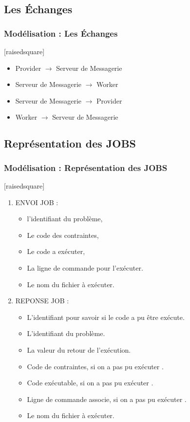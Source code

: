 \documentclass[slidetop,11pt]{beamer}
\begin{document}
\subsection[Les Échanges]{Les Échanges}
\begin{frame}[label=echanges]
\frametitle{Modélisation : Les Échanges}

[raisedsquare]
\begin{itemize}
      \item Provider $\rightarrow$ Serveur de Messagerie
      \item Serveur de Messagerie $\rightarrow$ Worker
      \item Serveur de Messagerie $\rightarrow$ Provider
      \item Worker $\rightarrow$ Serveur de Messagerie
\end{itemize}

\end{frame}
\subsection[Représentation des JOBS]{Représentation des JOBS}
\begin{frame}[label=rep_job,fragile]
\frametitle{Modélisation : Représentation des JOBS}
[raisedsquare]
 
\begin{enumerate} \item ENVOI JOB :
\begin{itemize}
\item l'identifiant du problème,
\item Le code des contraintes,
\item Le code a exécuter,
\item La ligne de  commande pour l\textquoteright exécuter.
\item Le nom du fichier à exécuter.
\end{itemize}
\item REPONSE JOB : 
\begin{itemize}
\item L'identifiant pour savoir si le code a pu être exécute.
\item L'identifiant du problème.
\item La valeur du retour de l\textquoteright exécution.
\item Code de contraintes, si on a pas pu exécuter .
\item Code exécutable, si on a pas pu exécuter .
\item Ligne de commande associe,  si on a pas pu exécuter .
\item Le nom du fichier à exécuter.
\end{itemize}
\end{enumerate}

\end{frame}
\end{document}
